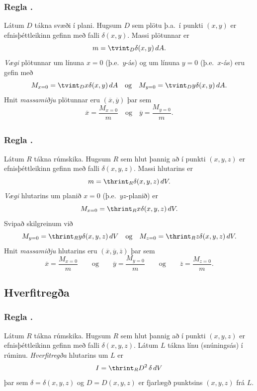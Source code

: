 \subsubsection{Regla \kaflanr.}
 Látum $D$ tákna svæði í plani.  Hugsum $D$ sem plötu þ.a.~í punkti $(x,y)$ er efnisþéttleikinn gefinn með falli $\delta(x,y)$.  Massi plötunnar er 
$$m=\tvint_D \delta(x,y)\,dA.$$
 {\em Vægi} plötunnar um línuna $x=0$ (þ.e.~$y$-ás) og um línuna $y=0$ (þ.e.~$x$-ás) eru gefin með
 $$M_{x=0}=\tvint_D x\delta(x,y)\,dA \quad \text{og} \quad M_{y=0}=\tvint_D y\delta(x,y)\,dA.$$
Hnit {\em massamiðju} plötunnar eru $(\overline{x}, \overline{y})$ þar sem 
$$\overline{x}=\frac{M_{x=0}}{m}
 \quad \text{og}\quad \overline{y}=\frac{M_{y=0}}{m}.$$






\subsection{} 

\subsubsection{Regla \kaflanr.}
 Látum $R$ tákna rúmskika.  Hugsum $R$ sem hlut þannig að í punkti $(x,y,z)$ er efnisþéttleikinn gefinn með falli $\delta(x,y,z)$.  Massi hlutarins er 
$$m=\thrint_R \delta(x,y,z)\,dV.$$
 {\em Vægi} hlutarins um planið $x=0$ (þ.e.~$yz$-planið) er
 $$M_{x=0}=\thrint_R x\delta(x,y,z)\,dV.$$
 Svipað skilgreinum við
 $$M_{y=0}=\thrint_R y\delta(x,y,z)\,dV 
 \quad \text{og}\quad
 M_{z=0}=\thrint_R z\delta(x,y,z)\,dV.$$
Hnit {\em massamiðju} hlutarins eru $(\overline{x}, \overline{y}, \overline{z})$ þar sem 
$$\overline{x}=\frac{M_{x=0}}{m}
\qquad\mbox{og}\qquad
\overline{y}=\frac{M_{y=0}}{m}
\qquad\mbox{og}\qquad
\overline{z}=\frac{M_{z=0}}{m}.$$





\subsection{Hverfitregða} 

\subsubsection{Regla \kaflanr.}
 Látum $R$ tákna rúmskika.  Hugsum $R$ sem hlut þannig að í punkti $(x,y,z)$ er efnisþéttleikinn gefinn með falli $\delta(x,y,z)$.  Látum $L$ tákna línu (snúningsás) í rúminu. {\em Hverfitregða} hlutarins um $L$ er
$$I=\thrint_R D^2 \,\delta\,dV$$
þar sem $\delta=\delta(x,y,z)$ og $D=D(x,y,z)$ er fjarlægð punktsins $(x,y,z)$ frá $L$.





